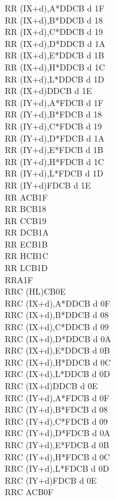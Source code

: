 \documentclass[oneside,a4paper]{book}
\begin{document}
\begin{multicols}{3}
{\begin{tabbing}
RR (IX+d),A*\>DDCB d 1F\\
RR (IX+d),B*\>DDCB d 18\\
RR (IX+d),C*\>DDCB d 19\\
RR (IX+d),D*\>DDCB d 1A\\
RR (IX+d),E*\>DDCB d 1B\\
RR (IX+d),H*\>DDCB d 1C\\
RR (IX+d),L*\>DDCB d 1D\\
RR (IX+d)\>DDCB d 1E\\
RR (IY+d),A*\>FDCB d 1F\\
RR (IY+d),B*\>FDCB d 18\\
RR (IY+d),C*\>FDCB d 19\\
RR (IY+d),D*\>FDCB d 1A\\
RR (IY+d),E*\>FDCB d 1B\\
RR (IY+d),H*\>FDCB d 1C\\
RR (IY+d),L*\>FDCB d 1D\\
RR (IY+d)\>FDCB d 1E\\
RR A\>CB1F\\
RR B\>CB18\\
RR C\>CB19\\
RR D\>CB1A\\
RR E\>CB1B\\
RR H\>CB1C\\
RR L\>CB1D\\
RRA\>1F\\
RRC (HL)\>CB0E\\
RRC (IX+d),A*\>DDCB d 0F\\
RRC (IX+d),B*\>DDCB d 08\\
RRC (IX+d),C*\>DDCB d 09\\
RRC (IX+d),D*\>DDCB d 0A\\
RRC (IX+d),E*\>DDCB d 0B\\
RRC (IX+d),H*\>DDCB d 0C\\
RRC (IX+d),L*\>DDCB d 0D\\
RRC (IX+d)\>DDCB d 0E\\
RRC (IY+d),A*\>FDCB d 0F\\
RRC (IY+d),B*\>FDCB d 08\\
RRC (IY+d),C*\>FDCB d 09\\
RRC (IY+d),D*\>FDCB d 0A\\
RRC (IY+d),E*\>FDCB d 0B\\
RRC (IY+d),H*\>FDCB d 0C\\
RRC (IY+d),L*\>FDCB d 0D\\
RRC (IY+d)\>FDCB d 0E\\
RRC A\>CB0F\\

\end{tabbing}}
\end{multicols}
\end{document}
